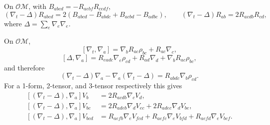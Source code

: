 \begin{lemma}
\label{lem:chow-ii-frame-curvature-evolution}
On $\mathcal O\mathcal M$, with $B_{abcd}=-R_{aebf}R_{cedf}$,
\[
 (\nabla_t-\Delta)R_{abcd}
 =2(B_{abcd}-B_{abdc}+B_{acbd}-B_{adbc}),
 \qquad
 (\nabla_t-\Delta)R_{ab}=2R_{acdb}R_{cd},
\]
where $\Delta=\sum_e\nabla_e\nabla_e$.
\end{lemma}

\begin{theorem}
\label{thm:chow-ii-frame-heat-commutators}
On $\mathcal O\mathcal M$,
\[
 [\nabla_t,\nabla_a]=\nabla_bR_{ac}\rho_{bc}+R_{ac}\nabla_c,
\]
\[
 [\Delta,\nabla_a]=R_{eadc}\nabla_e\rho_{cd}+R_{ad}\nabla_d
 +\nabla_bR_{ac}\rho_{bc},
\]
and therefore
\[
 (\nabla_t-\Delta)\nabla_a-
 \nabla_a(\nabla_t-\Delta)=R_{abdc}\nabla_b\rho_{cd}.
\]
For a 1-form, 2-tensor, and 3-tensor respectively this gives
\[
\begin{aligned}
 [(\nabla_t-\Delta),\nabla_a]V_b&=2R_{acdb}\nabla_cV_d,\\
 [(\nabla_t-\Delta),\nabla_a]V_{bc}&=2R_{adeb}\nabla_dV_{ec}+2R_{adec}\nabla_dV_{be},\\
 [(\nabla_t-\Delta),\nabla_a]V_{bcd}&=R_{aefb}\nabla_eV_{fcd}+R_{aefc}\nabla_eV_{bfd}+R_{aefd}\nabla_eV_{bcf}.
\end{aligned}
\]
\end{theorem}
